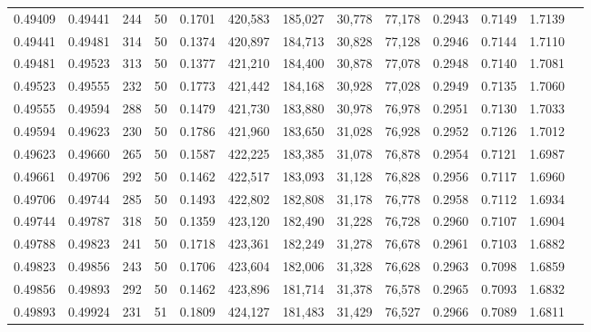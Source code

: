 \begin{tabular}{rrrrrrrrrrrrr}
0.49409 & 0.49441 &   244 &  50 &                                     0.1701 & 420,583 & 185,027 &  30,778 &  77,178 & 0.2943 & 0.7149 & 1.7139 \\
0.49441 & 0.49481 &   314 &  50 &                                     0.1374 & 420,897 & 184,713 &  30,828 &  77,128 & 0.2946 & 0.7144 & 1.7110 \\
0.49481 & 0.49523 &   313 &  50 &                                     0.1377 & 421,210 & 184,400 &  30,878 &  77,078 & 0.2948 & 0.7140 & 1.7081 \\
0.49523 & 0.49555 &   232 &  50 &                                     0.1773 & 421,442 & 184,168 &  30,928 &  77,028 & 0.2949 & 0.7135 & 1.7060 \\
0.49555 & 0.49594 &   288 &  50 &                                     0.1479 & 421,730 & 183,880 &  30,978 &  76,978 & 0.2951 & 0.7130 & 1.7033 \\
0.49594 & 0.49623 &   230 &  50 &                                     0.1786 & 421,960 & 183,650 &  31,028 &  76,928 & 0.2952 & 0.7126 & 1.7012 \\
0.49623 & 0.49660 &   265 &  50 &                                     0.1587 & 422,225 & 183,385 &  31,078 &  76,878 & 0.2954 & 0.7121 & 1.6987 \\
0.49661 & 0.49706 &   292 &  50 &                                     0.1462 & 422,517 & 183,093 &  31,128 &  76,828 & 0.2956 & 0.7117 & 1.6960 \\
0.49706 & 0.49744 &   285 &  50 &                                     0.1493 & 422,802 & 182,808 &  31,178 &  76,778 & 0.2958 & 0.7112 & 1.6934 \\
0.49744 & 0.49787 &   318 &  50 &                                     0.1359 & 423,120 & 182,490 &  31,228 &  76,728 & 0.2960 & 0.7107 & 1.6904 \\
0.49788 & 0.49823 &   241 &  50 &                                     0.1718 & 423,361 & 182,249 &  31,278 &  76,678 & 0.2961 & 0.7103 & 1.6882 \\
0.49823 & 0.49856 &   243 &  50 &                                     0.1706 & 423,604 & 182,006 &  31,328 &  76,628 & 0.2963 & 0.7098 & 1.6859 \\
0.49856 & 0.49893 &   292 &  50 &                                     0.1462 & 423,896 & 181,714 &  31,378 &  76,578 & 0.2965 & 0.7093 & 1.6832 \\
0.49893 & 0.49924 &   231 &  51 &                                     0.1809 & 424,127 & 181,483 &  31,429 &  76,527 & 0.2966 & 0.7089 & 1.6811 \\

\end{tabular}
